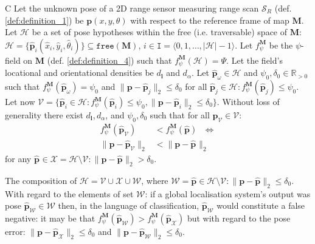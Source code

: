 \begin{customcnj}{C}
  \label{cnj:conjecture_c}
  Let the unknown pose of a 2D range sensor measuring range scan $\mathcal{S}_R$
  (def. \ref{def:definition_1}) be $\bm{p}(x,y,\theta)$ with respect to the
  reference frame of map $\bm{M}$.
  Let $\mathcal{H}$ be a set of pose hypotheses within the free (i.e.
  traversable) space of $\bm{M}$:
  $\mathcal{H} = \{\hat{\bm{p}}_i(\hat{x}_i,\hat{y}_i,\hat{\theta}_i)\} \subseteq \texttt{free}(\bm{M})$,
  $i \in \texttt{I} = \langle 0,1,\dots,|\mathcal{H}|-1\rangle$.
  Let $f_{\psi}^{\bm{M}}$ be the $\psi$-field on $\bm{M}$
  (def. \ref{def:definition_4}) such that $f_{\psi}^{\bm{M}}(\mathcal{H})= \Psi$.
  Let the field's locational and orientational densities be
  $d_{\bm{l}}$ and $d_{\alpha}$.
  Let $\hat{\bm{p}}_\omega \in \mathcal{H}$ and $\psi_0,\delta_0 \in \mathbb{R}_{>0}$
  such that $f_{\psi}^{\bm{M}}(\hat{\bm{p}}_\omega ) = \psi_0$ and
  $\|\bm{p}-\hat{\bm{p}}_j\|_2 \leq \delta_0$ for all
  $\hat{\bm{p}}_j \in \mathcal{H}: f_{\psi}^{\bm{M}}(\hat{\bm{p}}_j) \leq \psi_0$.
  Let now $\mathcal{V} = \{\hat{\bm{p}}_i \in \mathcal{H}: f_{\psi}^{\bm{M}}(\hat{\bm{p}}_i) \leq \psi_0,
  \|\bm{p}-\hat{\bm{p}}_i\|_2 \leq \delta_0\}$.
  Without loss of generality there exist $d_{\bm{l}}, d_{\alpha}$, and
  $\psi_0,\delta_0$ such that for all
  $\hat{\bm{p}}_\mathcal{V} \in \mathcal{V}$:
  \begin{align}
    f_{\psi}^{\bm{M}}(\hat{\bm{p}}_\mathcal{V}) &< f_{\psi}^{\bm{M}}(\hat{\bm{p}}) \ \ \ \Leftrightarrow \nonumber \\
    \|\bm{p}-\hat{\bm{p}}_\mathcal{V}\|_2 &< \|\bm{p}-\hat{\bm{p}}_{}\|_2 \nonumber
  \end{align}
  for any $\hat{\bm{p}}_{} \in \mathcal{X} = \mathcal{H} \setminus  \mathcal{V}: \|\bm{p}-\hat{\bm{p}}_{}\|_2 > \delta_0$.
\end{customcnj}

\begin{remark}
  \label{rem:remark_1}
  The composition of
  $\mathcal{H} = \mathcal{V} \cup \mathcal{X} \cup \mathcal{W}$, where
  $\mathcal{W} = \hat{\bm{p}} \in {\mathcal{H} \setminus \mathcal{V}}: \|\bm{p}-\hat{\bm{p}}\|_2 \leq \delta_0$.
  With regard to the elements of set $\mathcal{W}$: if a global localisation
  system's output was pose
  $\hat{\bm{p}}_{\mathcal{W}} \in \mathcal{W}$ then, in the language of
  classification, $\hat{\bm{p}}_{\mathcal{W}}$ would constitute a false
  negative: it may be that
  $f_{\psi}^{\bm{M}}(\hat{\bm{p}}_{\mathcal{W}}) > f_{\psi}^{\bm{M}}(\hat{\bm{p}}_{\mathcal{X}})$
  but with regard to the pose error:
  $\|\bm{p}-\hat{\bm{p}}_{\mathcal{X}}\|_2 \leq \delta_0$ and
  $\|\bm{p}-\hat{\bm{p}}_{\mathcal{W}}\|_2 \leq \delta_0$.
\end{remark}

